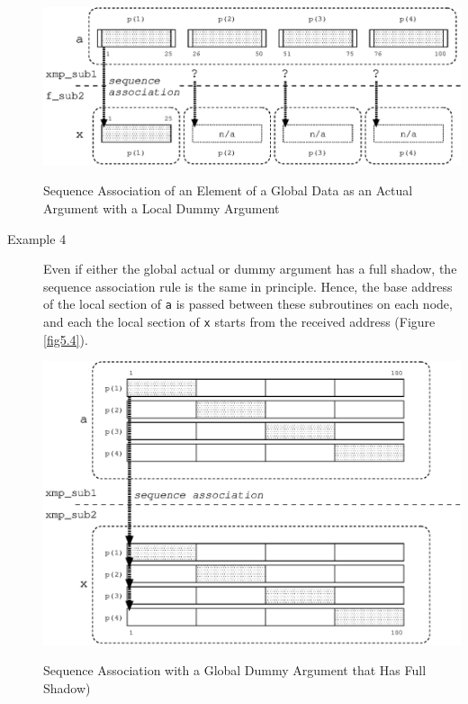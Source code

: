 \begin{description}
\begin{myfigure}
 \includegraphics[scale=0.7]{figs/fig5.3.eps}
 \caption{Sequence Association of an Element of a Global Data as an
 Actual Argument with a Local Dummy Argument}
 \label{fig5.3}
\end{myfigure}

\item[Example 4]

	   Even if either the global actual or dummy argument has a full
	   shadow, the sequence association rule is the same in
	   principle. Hence, the base address of the local section of
	   {\tt a} is passed between these subroutines on each node, and
	   each the local section of {\tt x} starts from the received
	   address (Figure \ref{fig5.4}).

\clearpage

\begin{myfigure}
 \includegraphics[scale=0.7]{figs/fig5.4.eps}
 \caption{Sequence Association with a Global Dummy Argument that Has
 Full Shadow)}
 \label{fig5.4}
\end{myfigure}

\end{description}


